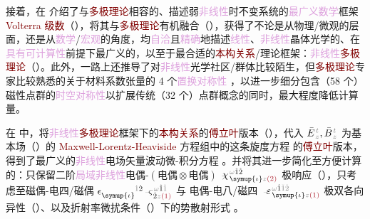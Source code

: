 接着，在  介绍了与\textcolor{Maroon}{多极理论}相容的、描述弱\textcolor{Plum}{非线性}时不变系统的\textcolor{Plum}{最广义数学}框架 \textcolor{Maroon}{Volterra 级数}（），将其与\textcolor{Maroon}{多极理论}有机融合（），获得了不论是从\textcolor{NavyBlue}{物理}/\textcolor{NavyBlue}{微观}的层面，还是从\textcolor{Plum}{数学}/\textcolor{Plum}{宏观}的角度，均\textcolor{Plum}{自洽}且\textcolor{Plum}{精确}地描述\textcolor{Plum}{线性}、\textcolor{Plum}{非线性}\textcolor{PineGreen}{晶体光学}的、在\textcolor{Plum}{具有可计算性}前提下最广义的，以至于最合适的\textcolor{Maroon}{本构关系}/\textcolor{NavyBlue}{理论框架}：\textcolor{Plum}{非线性}\textcolor{Maroon}{多极理论}（）。此外，一路上还推导了对\textcolor{Plum}{非线性}\textcolor{NavyBlue}{光学}社区/群体比较陌生，但\textcolor{Maroon}{多极理论}专家比较熟悉的关于材料系数张量的 4 个\textcolor{Plum}{置换对称性} ，以进一步细分包含（58 个）磁性点群的\textcolor{Plum}{时空对称性}以扩展传统（32 个）点群概念的同时，最大程度降低计算量。

在  中，将\textcolor{Plum}{非线性}\textcolor{Maroon}{多极理论}\textcolor{NavyBlue}{框架}下的\textcolor{Maroon}{本构关系}的\textcolor{Maroon}{傅立叶}版本（），代入 $\bar{E}^{\;\!\mathcolor{gray}{t}}_{\;\!\mathcolor{gray}{z}}, \bar{B}^{\;\!\mathcolor{gray}{t}}_{\;\!\mathcolor{gray}{z}}$ 为\textcolor{NavyBlue}{基本场}（）的 \textcolor{Maroon}{Maxwell-Lorentz-Heaviside} 方程组中的这条旋度方程  的\textcolor{Maroon}{傅立叶}版本，得到了最广义的\textcolor{Plum}{非线性}电场矢量波动微-积分方程 。并将其进一步简化至方便计算的：只保留二阶\textcolor{Plum}{局域}\textcolor{Plum}{非线性}\textcolor{NavyBlue}{电偶-$(\text{电偶}\otimes\text{电偶})$} $\Xint{{}^{}_{\mathcolor{gray}{-}}}{23}{\chi}^{\;\! \mathcolor{gray}{\omega} \hat{1} \hat{2}}_{\;\! \symup{\iota} \mathcolor{gray}{z} \textcolor{Maroon}{(2)}}$ 极响应（），只考虑至\textcolor{NavyBlue}{磁偶-电四/磁偶} $\epsilon^{\hphantom{\symup{\iota}}\mathcolor{gray}{\dot{1}}\dot{2}}_{\symup{\iota}} \Xint{\begin{smallmatrix} ~ \\ {}^{}_{\mathcolor{gray}{-}} \\ ~ \end{smallmatrix}}{13}{\varsigma}^{\;\! \mathcolor{gray}{\omega} \hat{1} \mathcolor{gray}{\check{1}}}_{\;\! \dot{2} \mathcolor{gray}{z} \textcolor{Maroon}{(1)}}$ 与 \textcolor{NavyBlue}{电偶-电八/磁四} $\Xint{\begin{smallmatrix} ~ \\ {}^{}_{\mathcolor{gray}{-}} \\ ~ \end{smallmatrix}}{16}{\varepsilon}^{\;\! \mathcolor{gray}{\omega} \hat{1} \mathcolor{gray}{\check{1} \check{2}}}_{\;\! \symup{\iota} \mathcolor{gray}{z} \textcolor{Maroon}{(1)}}$ 极\textcolor{PineGreen}{双各向异性}（）、以及\textcolor{PineGreen}{折射率}\textcolor{NavyBlue}{微扰}条件（）下的势散射形式 。

